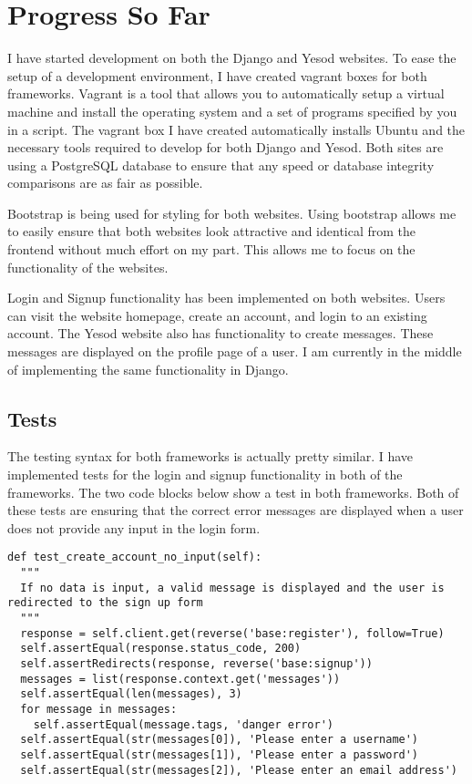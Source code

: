 \section{Progress So Far}

I have started development on both the Django and Yesod websites. To ease the setup of a development environment, I have created vagrant boxes for both frameworks. Vagrant is a tool that allows you to automatically setup a virtual machine and install the operating system and a set of programs specified by you in a script. The vagrant box I have created automatically installs Ubuntu and the necessary tools required to develop for both Django and Yesod. Both sites are using a PostgreSQL database to ensure that any speed or database integrity comparisons are as fair as possible.

Bootstrap is being used for styling for both websites. Using bootstrap allows me to easily ensure that both websites look attractive and identical from the frontend without much effort on my part. This allows me to focus on the functionality of the websites.

Login and Signup functionality has been implemented on both websites. Users can visit the website homepage, create an account, and login to an existing account. The Yesod website also has functionality to create messages. These messages are displayed on the profile page of a user. I am currently in the middle of implementing the same functionality in Django.

\subsection{Tests}

The testing syntax for both frameworks is actually pretty similar. I have implemented tests for the login and signup functionality in both of the frameworks. The two code blocks below show a test in both frameworks. Both of these tests are ensuring that the correct error messages are displayed when a user does not provide any input in the login form.

\begin{lstlisting}[caption="A Django Test"]
def test_create_account_no_input(self):
  """
  If no data is input, a valid message is displayed and the user is redirected to the sign up form
  """
  response = self.client.get(reverse('base:register'), follow=True)
  self.assertEqual(response.status_code, 200)
  self.assertRedirects(response, reverse('base:signup'))
  messages = list(response.context.get('messages'))
  self.assertEqual(len(messages), 3)
  for message in messages:
    self.assertEqual(message.tags, 'danger error')
  self.assertEqual(str(messages[0]), 'Please enter a username')
  self.assertEqual(str(messages[1]), 'Please enter a password')
  self.assertEqual(str(messages[2]), 'Please enter an email address')
\end{lstlisting}

